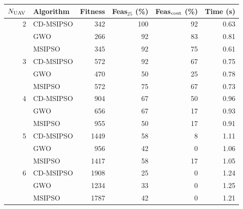 \begin{tabular}{rlrrrr}
\hline
$N_{\rm UAV}$ & Algorithm & Fitness & Feas$_{25}$ (\%) & Feas$_{\rm cont}$ (\%) & Time (s) \\
\hline
2 & CD-MSIPSO & 342 & 100 & 92 & 0.63 \\
 & GWO & 266 & 92 & 83 & 0.81 \\
 & MSIPSO & 345 & 92 & 75 & 0.61 \\
\hline
3 & CD-MSIPSO & 572 & 92 & 67 & 0.75 \\
 & GWO & 470 & 50 & 25 & 0.78 \\
 & MSIPSO & 572 & 75 & 67 & 0.73 \\
\hline
4 & CD-MSIPSO & 904 & 67 & 50 & 0.96 \\
 & GWO & 656 & 67 & 17 & 0.93 \\
 & MSIPSO & 955 & 50 & 17 & 0.91 \\
\hline
5 & CD-MSIPSO & 1449 & 58 & 8 & 1.11 \\
 & GWO & 956 & 42 & 0 & 1.06 \\
 & MSIPSO & 1417 & 58 & 17 & 1.05 \\
\hline
6 & CD-MSIPSO & 1908 & 25 & 0 & 1.24 \\
 & GWO & 1234 & 33 & 0 & 1.25 \\
 & MSIPSO & 1787 & 42 & 0 & 1.21 \\
\hline
\end{tabular}